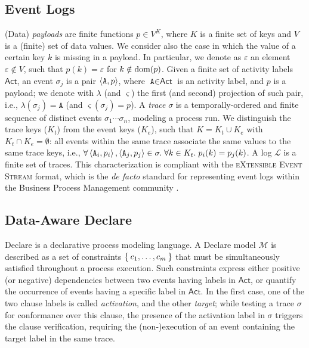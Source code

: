 \subsection{Event Logs}
(Data) \textit{payloads} are finite functions $p\in V^K$, where $K$ is a finite set of keys and $V$ is a (finite) set of data values. We consider also the case in which the value of a certain key $k$ is missing in a payload. In particular, we denote as $\varepsilon$ an element $\varepsilon\notin V$, such that $p(k)=\varepsilon$ for $k\notin\textup{dom}(p)$. Given a finite set of activity labels $\textsf{Act}$, an event $\sigma_j$ is a pair $\Braket{\texttt{A},p}$, where $\texttt{A}\in\textsf{Act}$ is an activity label, and $p$ is a payload; we denote with $\lambda$ (and $\varsigma$) the first (and second) projection of such pair, i.e., $\lambda(\sigma_j)=\texttt{A}$ (and $\varsigma(\sigma_j)=p$). A \textit{trace} $\sigma$ is a temporally-ordered and finite sequence of distinct events $\sigma_1\cdots\sigma_n$, modeling a process run. We distinguish the trace keys ($K_t$) from the event keys ($K_e$), such that $K=K_t\cup K_e$ with $K_t\cap K_e=\emptyset$: all events within the same trace associate the same values to the same trace keys, i.e., $\forall \Braket{\texttt{A}_i,p_i},\Braket{\texttt{A}_j,p_j}\in\sigma.\;\forall k\in K_t.\; p_i(k)=p_j(k)$. A log $\mathcal{L}$ is a finite set of traces. This  characterization is compliant with the \textsc{eXtensible Event Stream} format, which is the \textit{de facto} standard for representing event logs within the Business Process Management community \cite{XES}.


\subsection{Data-Aware Declare}\label{ssec:dad}
Declare is a declarative process modeling language. A Declare model $\mathcal{M}$ is described as a set of constraints $\Set{c_1,\dots,c_m}$ that must be simultaneously satisfied throughout a process execution.
Such constraints express either positive (or negative) dependencies between two events having labels in $\textsf{Act}$, or quantify the occurrence of events having a specific label in $\textsf{Act}$. In the first case, one of the two clause labels is called \textit{activation}, and the other \textit{target}; while testing a trace $\sigma$ for conformance over this clause, the presence of the activation label in $\sigma$ triggers the clause verification, requiring the (non-)execution of an event containing the target label in the same trace.

